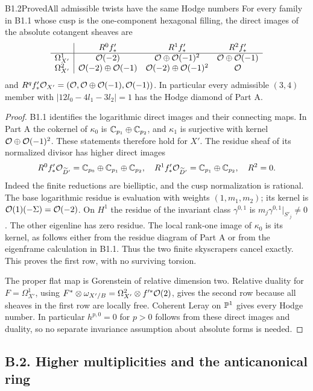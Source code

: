 \begin{claim}{B1.2}{Proved}{All admissible twists have the same Hodge numbers}
For every family in B1.1 whose cusp is the one-component hexagonal filling,
the direct images of the absolute cotangent sheaves are
\[
\begin{array}{c|ccc}
 &R^0f'_*&R^1f'_*&R^2f'_*\\\hline
\Omega^1_{X'}&\mathcal O(-2)&\mathcal O\oplus\mathcal O(-1)^2&\mathcal O\oplus\mathcal O(-1)\\
\Omega^2_{X'}&\mathcal O(-2)\oplus\mathcal O(-1)&\mathcal O(-2)\oplus\mathcal O(-1)^2&\mathcal O
\end{array}
\]
and $R^qf'_*\mathcal O_{X'}=(\mathcal O,\mathcal O\oplus\mathcal O(-1),\mathcal O(-1))$.
In particular every admissible $(3,4)$ member with
$|12l_0-4l_1-3l_2|=1$ has the Hodge diamond of Part A.
\end{claim}
\begin{proof}
B1.1 identifies the logarithmic direct images and their connecting maps.
In Part A the cokernel of $\kappa_0$ is
$\mathbb C_{p_1}\oplus\mathbb C_{p_2}$, and $\kappa_1$ is surjective with kernel
$\mathcal O\oplus\mathcal O(-1)^2$. These statements therefore hold for $X'$.
The residue sheaf of its normalized divisor has higher direct images
\[
R^0f'_*\mathcal O_{\widetilde D'}=\mathbb C_{p_0}\oplus\mathbb C_{p_1}\oplus\mathbb C_{p_2},
\quad R^1f'_*\mathcal O_{\widetilde D'}=\mathbb C_{p_1}\oplus\mathbb C_{p_2},
\quad R^2=0.
\]
Indeed the finite reductions are bielliptic, and the cusp normalization
is rational. The base logarithmic residue is evaluation with weights
$(1,m_1,m_2)$; its kernel is $\mathcal O(1)(-\Sigma)=\mathcal O(-2)$.
On $H^1$ the residue of the invariant class $\gamma^{0,1}$ is
$m_j\gamma^{0,1}|_{S'_j}\ne0$. The other eigenline has zero residue.
The local rank-one image of $\kappa_0$ is its kernel, as follows either
from the residue diagram of Part A or from the eigenframe calculation
in B1.1. Thus the two finite skyscrapers cancel exactly. This proves
the first row, with no surviving torsion.

The proper flat map is Gorenstein of relative dimension two. Relative
duality for $F=\Omega^1_{X'}$, using
$F^*\otimes\omega_{X'/B}=\Omega^2_{X'}\otimes f'^*\mathcal O(2)$,
gives the second row because all sheaves in the first row are locally
free. Coherent Leray on $\mathbb P^1$ gives every Hodge number. In particular
$h^{p,0}=0$ for $p>0$ follows from these direct images and duality,
so no separate invariance assumption about absolute forms is needed.
\end{proof}

\subsection{B.2. Higher multiplicities and the anticanonical ring}

